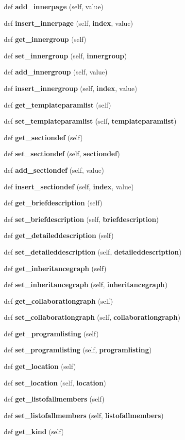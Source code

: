 \begin{DoxyCompactItemize}
def {\bf add\+\_\+innerpage} (self, value)
\item 
def {\bf insert\+\_\+innerpage} (self, {\bf index}, value)
\item 
def {\bf get\+\_\+innergroup} (self)
\item 
def {\bf set\+\_\+innergroup} (self, {\bf innergroup})
\item 
def {\bf add\+\_\+innergroup} (self, value)
\item 
def {\bf insert\+\_\+innergroup} (self, {\bf index}, value)
\item 
def {\bf get\+\_\+templateparamlist} (self)
\item 
def {\bf set\+\_\+templateparamlist} (self, {\bf templateparamlist})
\item 
def {\bf get\+\_\+sectiondef} (self)
\item 
def {\bf set\+\_\+sectiondef} (self, {\bf sectiondef})
\item 
def {\bf add\+\_\+sectiondef} (self, value)
\item 
def {\bf insert\+\_\+sectiondef} (self, {\bf index}, value)
\item 
def {\bf get\+\_\+briefdescription} (self)
\item 
def {\bf set\+\_\+briefdescription} (self, {\bf briefdescription})
\item 
def {\bf get\+\_\+detaileddescription} (self)
\item 
def {\bf set\+\_\+detaileddescription} (self, {\bf detaileddescription})
\item 
def {\bf get\+\_\+inheritancegraph} (self)
\item 
def {\bf set\+\_\+inheritancegraph} (self, {\bf inheritancegraph})
\item 
def {\bf get\+\_\+collaborationgraph} (self)
\item 
def {\bf set\+\_\+collaborationgraph} (self, {\bf collaborationgraph})
\item 
def {\bf get\+\_\+programlisting} (self)
\item 
def {\bf set\+\_\+programlisting} (self, {\bf programlisting})
\item 
def {\bf get\+\_\+location} (self)
\item 
def {\bf set\+\_\+location} (self, {\bf location})
\item 
def {\bf get\+\_\+listofallmembers} (self)
\item 
def {\bf set\+\_\+listofallmembers} (self, {\bf listofallmembers})
\item 
def {\bf get\+\_\+kind} (self)

\end{DoxyCompactItemize}
